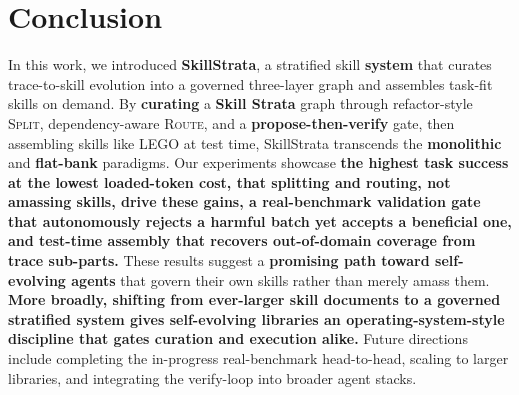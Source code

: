 \section{Conclusion}
\label{sec:conclusion}


In this work, we introduced \textbf{SkillStrata}, a stratified skill \textbf{system} that curates trace-to-skill evolution into a governed three-layer graph and assembles task-fit skills on demand.
By \textbf{curating} a \textbf{Skill Strata} graph through refactor-style \textsc{Split}, dependency-aware \textsc{Route}, and a \textbf{propose-then-verify} gate, then assembling skills like LEGO at test time, SkillStrata transcends the \textbf{monolithic} and \textbf{flat-bank} paradigms.
Our experiments showcase \textbf{ the highest task success at the lowest loaded-token cost,  that splitting and routing, not amassing skills, drive these gains,  a real-benchmark validation gate that autonomously rejects a harmful batch yet accepts a beneficial one, and  test-time assembly that recovers out-of-domain coverage from trace sub-parts.}
These results suggest a \textbf{promising path toward self-evolving agents} that govern their own skills rather than merely amass them.
\textbf{More broadly, shifting from ever-larger skill documents to a governed stratified system gives self-evolving libraries an operating-system-style discipline that gates curation and execution alike.}
Future directions include completing the in-progress real-benchmark head-to-head, scaling to larger libraries, and integrating the verify-loop into broader agent stacks.
